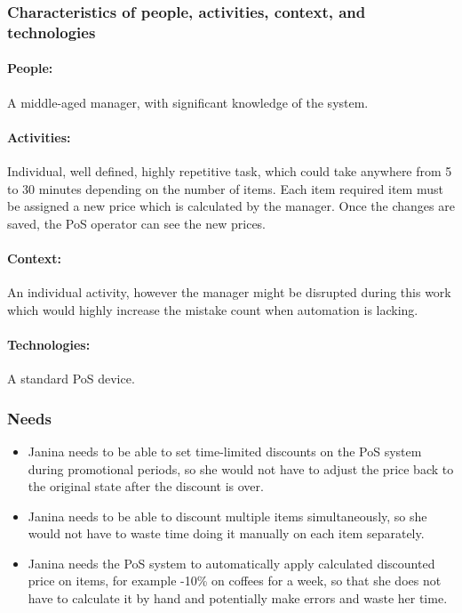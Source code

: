 \documentclass{article}
\begin{document}
\subsubsection{Characteristics of people, activities, context, and technologies}
\paragraph{\small People:} A middle-aged manager, with significant knowledge of the system.
\paragraph{\small Activities:} Individual, well defined, highly repetitive task, which could take anywhere from 5 to 30 minutes depending on the number of items. Each item required item must be assigned a new price which is calculated by the manager. Once the changes are saved, the PoS operator can see the new prices. 
\paragraph{\small Context:} An individual activity, however the manager might be disrupted during this work which would highly increase the mistake count when automation is lacking.
\paragraph{\small Technologies:} A standard PoS device.


\subsubsection{Needs}
\begin{itemize}
    \item Janina needs to be able to set time-limited discounts on the PoS system during promotional periods, so she would not have to adjust the price back to the original state after the discount is over.
    \item Janina needs to be able to discount multiple items simultaneously, so she would not have to waste time doing it manually on each item separately.
    \item Janina needs the PoS system to automatically apply calculated discounted price on items, for example -10\% on coffees for a week, so that she does not have to calculate it by hand and potentially make errors and waste her time.
\end{itemize}
\end{document}
